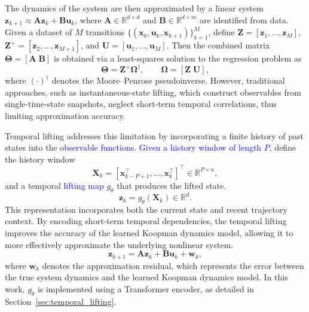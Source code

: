 \documentclass[journal]{IEEEtran}
\newcommand{\vx}{\mathbf{x}}
\newcommand{\vu}{\mathbf{u}}
\newcommand{\vz}{\mathbf{z}}
\newcommand{\vw}{\mathbf{w}}
\newcommand{\mA}{\mathbf{A}}
\newcommand{\mB}{\mathbf{B}}
\newcommand{\mX}{\mathbf{X}}
\newcommand{\mZ}{\mathbf{Z}}
\newcommand{\mU}{\mathbf{U}}
\newcommand{\mTheta}{\boldsymbol{\Theta}}
\newcommand{\mOmega}{\boldsymbol{\Omega}}
\begin{document}
The dynamics of the system are then approximated by a linear system $\vz_{k+1} \approx \mA \vz_k + \mB \vu_k$, where $\mA \in \mathbb{R}^{d \times d}$ and $\mB \in \mathbb{R}^{d \times m}$ are identified from data. Given a dataset of $M$ transitions $\{(\vx_k, \vu_k, \vx_{k+1})\}_{k=1}^M$, define $\mZ = [\vz_1, \ldots, \vz_M]$, $\mZ^+ = [\vz_2, \ldots, \vz_{M+1}]$, and $\mU = [\vu_1, \ldots, \vu_M]$. Then the combined matrix $\mTheta = [\mA \; \mB]$ is obtained via a least-squares solution to the regression problem as
\begin{equation}
    \mTheta = \mZ^+ \mOmega^\dagger, \qquad \mOmega = [\mZ \; \mU],
    \label{eq:edmd_regression}
\end{equation}
where $(\cdot)^\dagger$ denotes the Moore--Penrose pseudoinverse. However, traditional approaches, such as instantaneous-state lifting, which construct observables from single-time-state snapshots, neglect short-term temporal correlations, thus limiting approximation accuracy.

Temporal lifting addresses this limitation by incorporating a finite history of past states into the \textcolor{blue}{observable functions}. \textcolor{blue}{Given a history window of length $P$}, define the history window
\begin{equation}
    \mX_k = [\vx_{k-P+1}^\top, \ldots, \vx_k^\top]^\top \in \mathbb{R}^{P\times n},
    \label{eq:history_window}
\end{equation}
and a temporal \textcolor{blue}{lifting map} $g_\theta$ that produces the lifted state.
\begin{equation}
    \vz_k = g_\theta(\mX_k) \in \mathbb{R}^d.
    \label{eq:temporal_lifting}
\end{equation}
This representation incorporates both the current state and recent trajectory context. By encoding short-term temporal dependencies, the temporal lifting improves the accuracy of the learned Koopman dynamics model, allowing it to more effectively approximate the underlying nonlinear system.
\begin{equation}
    \vz_{k+1} = \mA \vz_k + \mB \vu_k + \vw_k,
    \label{eq:lifted_dynamics_prelim}
\end{equation}
where $\vw_k$ denotes the approximation residual, which represents the error between the true system dynamics and the learned Koopman dynamics model. In this work, $g_\theta$ is implemented using a Transformer encoder, as detailed in Section~\ref{sec:temporal_lifting}.

\end{document}
